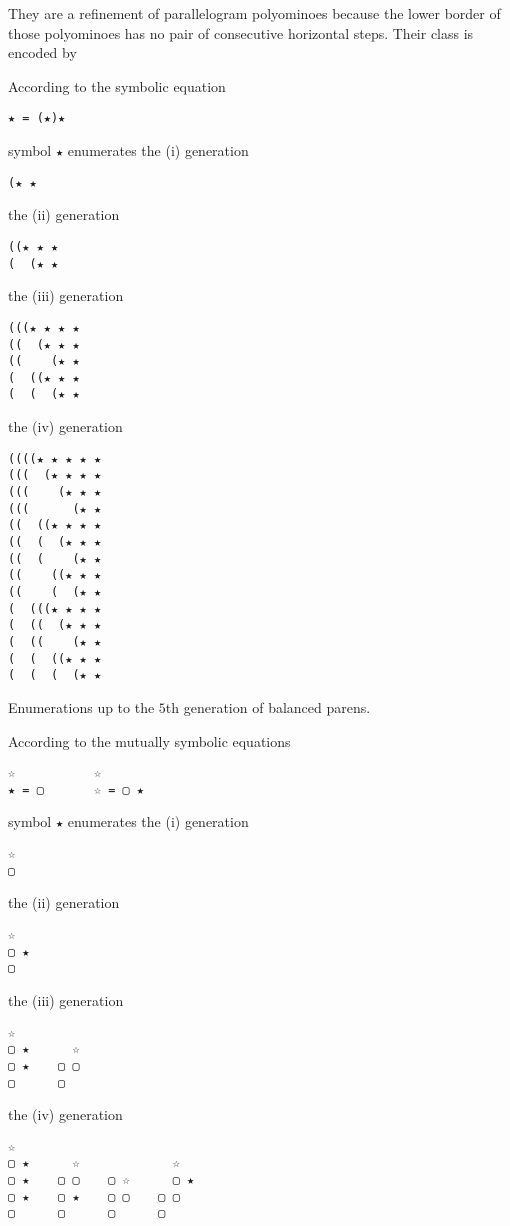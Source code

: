 \begin{example} They are a refinement of
parallelogram polyominoes because the lower border of those polyominoes has no
pair of consecutive horizontal steps. Their class is encoded by

\begin{margintable}[-17cm]
\noindent According to the symbolic equation
\begin{Verbatim}[baselinestretch=0.5]
★ = (★)★
\end{Verbatim}
symbol \verb|★| enumerates the (i) generation
\begin{Verbatim}[baselinestretch=0.5]
(★ ★
\end{Verbatim}
the (ii) generation
\begin{Verbatim}[baselinestretch=0.5]
((★ ★ ★
(  (★ ★
\end{Verbatim}
the (iii) generation
\begin{Verbatim}[baselinestretch=0.5]
(((★ ★ ★ ★
((  (★ ★ ★
((    (★ ★
(  ((★ ★ ★
(  (  (★ ★
\end{Verbatim}
the (iv) generation
\begin{Verbatim}[baselinestretch=0.5]
((((★ ★ ★ ★ ★
(((  (★ ★ ★ ★
(((    (★ ★ ★
(((      (★ ★
((  ((★ ★ ★ ★
((  (  (★ ★ ★
((  (    (★ ★
((    ((★ ★ ★
((    (  (★ ★
(  (((★ ★ ★ ★
(  ((  (★ ★ ★
(  ((    (★ ★
(  (  ((★ ★ ★
(  (  (  (★ ★
\end{Verbatim}
\caption{Enumerations up to the $5$th generation of balanced parens.}
\label{tbl:eco:balanced:parens}
\end{margintable}

\begin{margintable}[-3cm]
\noindent According to the mutually symbolic equations
\begin{Verbatim}[baselinestretch=0.5]
    ☆           ☆
★ = ▢       ☆ = ▢ ★
\end{Verbatim}
symbol \verb|★| enumerates the (i) generation
\begin{Verbatim}[baselinestretch=0.5]
☆
▢
\end{Verbatim}
the (ii) generation
\begin{Verbatim}[baselinestretch=0.5]
☆
▢ ★
▢
\end{Verbatim}
the (iii) generation
\begin{Verbatim}[baselinestretch=0.5]
☆
▢ ★      ☆
▢ ★    ▢ ▢
▢      ▢
\end{Verbatim}
the (iv) generation
\begin{Verbatim}[baselinestretch=0.5]
☆
▢ ★      ☆             ☆
▢ ★    ▢ ▢    ▢ ☆      ▢ ★
▢ ★    ▢ ★    ▢ ▢    ▢ ▢
▢      ▢      ▢      ▢


\end{Verbatim}
\end{margintable}
\end{example}
